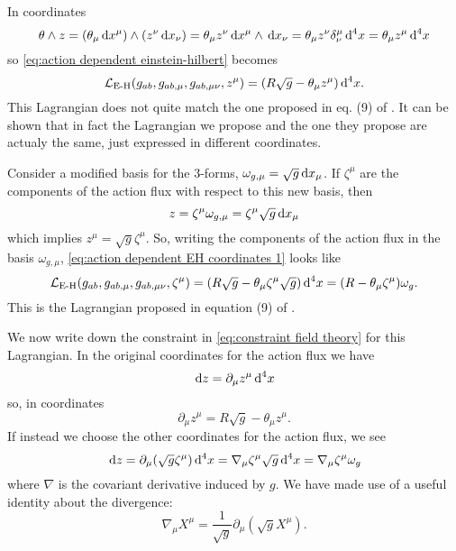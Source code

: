 \documentclass[../main.tex]{subfiles}
\begin{document}
In coordinates 
\begin{equation*}
	\theta \wedge z = (\theta_\mu \,\mathrm{d} x^\mu) \wedge (z^\nu \,\mathrm{d} x_\nu) = \theta_\mu z^\nu \,\mathrm{d}
	x^\mu \wedge \,\mathrm{d} x_\nu = \theta_\mu z^\nu \delta^\mu_\nu \,\mathrm{d}^4 x = \theta_\mu z^\mu
	\,\mathrm{d}^4x
\end{equation*}
so \cref{eq:action dependent einstein-hilbert} becomes 
\begin{equation}\label{eq:action dependent EH coordinates 1}
	\mathcal{L}_{\text{E-H}}(g_{ab}, g_{ab,\mu}, g_{ab,\mu\nu}, z^\mu) = (R\sqrt{g} - \theta_\mu
	z^\mu) \,\mathrm{d}^4 x. 
\end{equation}
This Lagrangian does not quite match the one proposed in eq. (9) of \cite{Lazo2017}. It
can be shown that in fact the Lagrangian we propose and the one they propose are actualy
the same, just expressed in different coordinates. 

Consider a modified basis for the 3-forms, \( \omega_{g,\mu} = \sqrt{g}
\,\mathrm{d} x_\mu \). If \( \zeta^\mu \) are the components of the action flux with respect to
this new basis, then
\begin{equation*}
	z = \zeta^\mu \omega_{g,\mu} = \zeta^\mu \sqrt{g} \,\mathrm{d} x_\mu
\end{equation*}
which implies \( z^\mu = \sqrt{g} \zeta^\mu \). So, writing the components of the action
flux in the basis \( \omega_{g,\mu} \), \cref{eq:action dependent EH coordinates 1} looks like
\begin{equation}\label{eq:action dependent EH coordinates 2}
	\mathcal{L}_{\text{E-H}}(g_{ab}, g_{ab,\mu}, g_{ab,\mu\nu}, \zeta^\mu) = (R\sqrt{g} - \theta_\mu
	\zeta^\mu \sqrt{g}) \,\mathrm{d}^4 x = (R - \theta_\mu \zeta^\mu)\omega_g.
\end{equation}
This is the Lagrangian proposed in equation (9) of \cite{Lazo2017}. 

We now write down the constraint in \cref{eq:constraint field theory} for this Lagrangian.
In the original coordinates for the action flux we have
\begin{equation*}
	\,\mathrm{d} z = \partial_\mu z^\mu \,\mathrm{d}^4 x
\end{equation*}
so, in coordinates
\begin{equation} \label{eq:constraint coordinates 1}
	\partial_\mu z^\mu = R\sqrt{g} - \theta_\mu z^\mu. 
\end{equation}
If instead we choose the other coordinates for the action flux, we see
\begin{equation*}
	\,\mathrm{d} z = \partial_\mu (\sqrt{g} \zeta^\mu) \,\mathrm{d}^4 x = \nabla_\mu \zeta^\mu \sqrt{g}\,\mathrm{d}^4x
	= \nabla_\mu \zeta^\mu \omega_g
\end{equation*}
where \( \nabla \) is the covariant derivative induced by \( g \). We have made use of a
useful identity about the divergence:
\begin{equation} \label{eq:divergence identity}
	\nabla_\mu X^\mu = \frac{1}{\sqrt{g}} \partial_\mu (\sqrt{g}X^\mu).
\end{equation}
\end{document}
